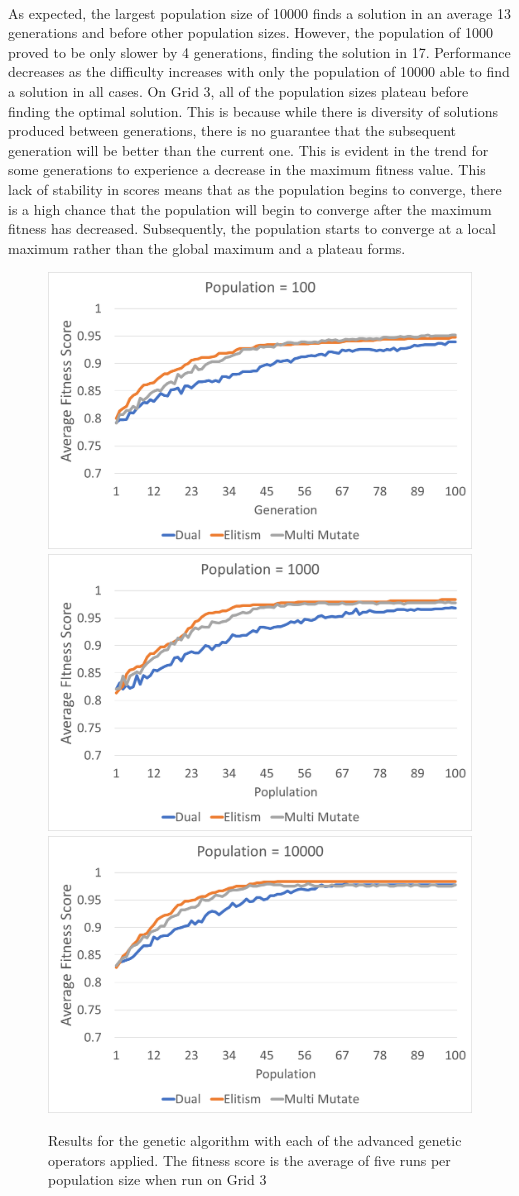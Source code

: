 \documentclass[10pt]{article}
\begin{document}
\paragraph{}
As expected, the largest population size of 10000 finds a solution in an average 13 generations and before other population sizes. However, the population of 1000 proved to be only slower by 4 generations, finding the solution in 17. Performance decreases as the difficulty increases with only the population of 10000 able to find a solution in all cases. On Grid 3, all of the population sizes plateau before finding the optimal solution. This is because while there is diversity of solutions produced between generations, there is no guarantee that the subsequent generation will be better than the current one. This is evident in the trend for some generations to experience a decrease in the maximum fitness value. This lack of stability in scores means that as the population begins to converge, there is a high chance that the population will begin to converge after the maximum fitness has decreased. Subsequently, the population starts to converge at a local maximum rather than the global maximum and a plateau forms.  

\begin{figure}[htp]

\centering
\includegraphics[width=.329\linewidth]{i/one_true_100.png}\hfill
\includegraphics[width=.329\linewidth]{i/one_true_1000.png}\hfill
\includegraphics[width=.329\linewidth]{i/one_true_10000.png}

\caption{Results for the genetic algorithm with each of the advanced genetic operators applied. The fitness score is the average of five runs per population size when run on Grid 3}
\label{fig:one_true}

\end{figure}
\end{document}
